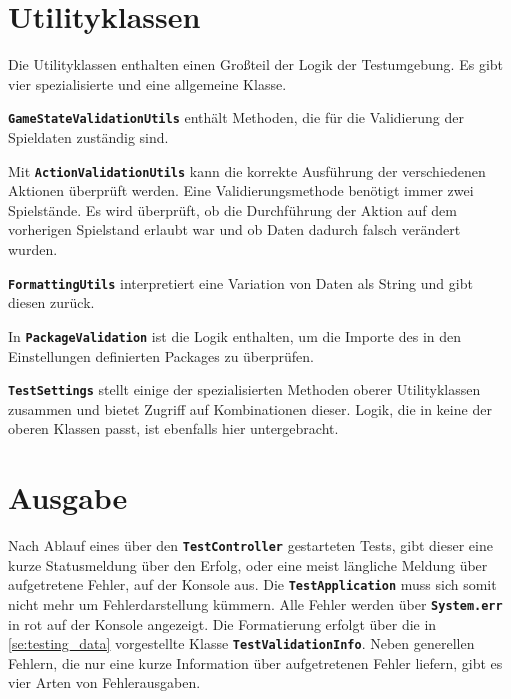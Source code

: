 \documentclass[
							a4paper, 
							11pt, 
							openany, 
							liststotoc,
							parskip=half, 
   							headings=normal
						]{scrreprt}
\begin{document}
{\clearpage

\section{Utilityklassen} \label{se:testing_utility}
Die Utilityklassen enthalten einen Großteil der Logik der Testumgebung. Es gibt vier spezialisierte und eine allgemeine Klasse.

\textbf{\texttt{GameStateValidationUtils}} enthält Methoden, die für die Validierung der Spieldaten zuständig sind.

Mit \textbf{\texttt{ActionValidationUtils}} kann die korrekte Ausführung der verschiedenen Aktionen überprüft werden. Eine Validierungsmethode benötigt immer zwei Spielstände. Es wird überprüft, ob die Durchführung der Aktion auf dem vorherigen Spielstand erlaubt war und ob Daten dadurch falsch verändert wurden.

\textbf{\texttt{FormattingUtils}} interpretiert eine Variation von Daten als String und gibt diesen zurück.

In \textbf{\texttt{PackageValidation}} ist die Logik enthalten, um die Importe des in den Einstellungen definierten Packages zu überprüfen.

\textbf{\texttt{TestSettings}} stellt einige der spezialisierten Methoden oberer Utilityklassen zusammen und bietet Zugriff auf Kombinationen dieser. Logik, die in keine der oberen Klassen passt, ist ebenfalls hier untergebracht.

\clearpage

\section{Ausgabe} \label{se:testing_output}
Nach Ablauf eines über den \textbf{\texttt{TestController}} gestarteten Tests, gibt dieser eine kurze Statusmeldung über den Erfolg, oder eine meist längliche Meldung über aufgetretene Fehler, auf der Konsole aus. Die \textbf{\texttt{TestApplication}} muss sich somit nicht mehr um Fehlerdarstellung kümmern. Alle Fehler werden über \textbf{\texttt{System.err}} in rot auf der Konsole angezeigt. Die Formatierung erfolgt über die in \autoref{se:testing_data} vorgestellte  Klasse \textbf{\texttt{TestValidationInfo}}. \newline
Neben generellen Fehlern, die nur eine kurze Information über aufgetretenen Fehler liefern, gibt es vier Arten von Fehlerausgaben.\bigskip

}
\end{document}
